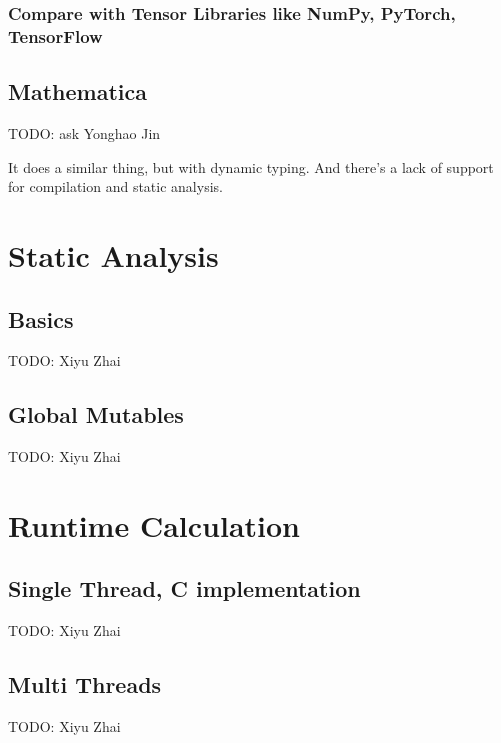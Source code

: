\documentclass{article}
\begin{document}
\subsubsection{Compare with Tensor Libraries like NumPy, PyTorch, TensorFlow}

\subsection{Mathematica}
TODO: ask Yonghao Jin

It does a similar thing, but with dynamic typing. And there's a lack of support for compilation and static analysis.

\section{Static Analysis}
\subsection{Basics}
TODO: Xiyu Zhai
\subsection{Global Mutables}
TODO: Xiyu Zhai

\section{Runtime Calculation}
\subsection{Single Thread, C implementation}
TODO: Xiyu Zhai
\subsection{Multi Threads}
TODO: Xiyu Zhai

\end{document}
